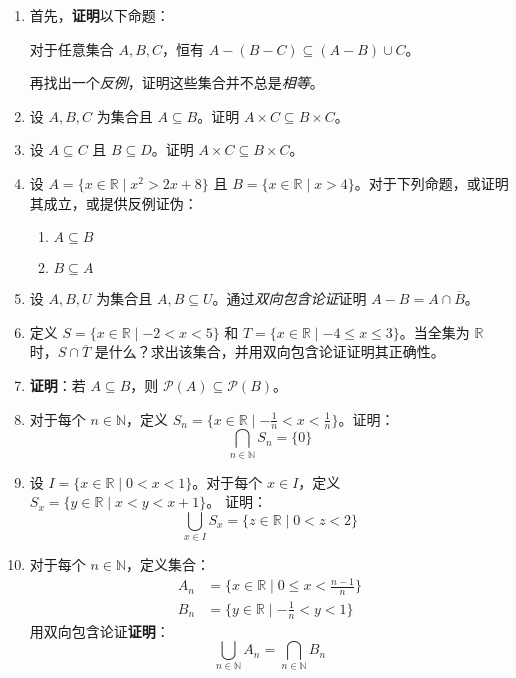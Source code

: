 \begin{enumerate}[label=(\arabic*)]
    \item 首先，\textbf{证明}以下命题：
        \begin{center}
            对于任意集合 $A,B,C$，恒有 $A - (B - C) \subseteq (A - B) \cup C$。
        \end{center}
        再找出一个\emph{反例}，证明这些集合并不总是\emph{相等}。
    \item 设 $A,B,C$ 为集合且 $A \subseteq B$。证明 $A \times C \subseteq B \times C$。
    \item 设 $A \subseteq C$ 且 $B \subseteq D$。证明 $A \times C \subseteq B \times C$。
    \item 设 $A = \{x \in \mathbb{R} \mid x^2 > 2x + 8\}$ 且 $B = \{x \in \mathbb{R} \mid x > 4\}$。对于下列命题，或证明其成立，或提供反例证伪：
        \begin{enumerate}[label=(\alph*)]
            \item $A \subseteq B$
            \item $B \subseteq A$
        \end{enumerate}
    \item 设 $A, B, U$ 为集合且 $A, B \subseteq U$。通过\emph{双向包含论证}证明 $A - B = A \cap \overline{B}$。
    \item 定义 $S = \{x \in \mathbb{R} \mid -2 < x < 5\}$ 和 $T = \{x \in \mathbb{R} \mid -4 \le x \le 3\}$。当全集为 $\mathbb{R}$ 时，$S \cap \overline{T}$ 是什么？求出该集合，并用双向包含论证证明其正确性。
    \item \textbf{证明}：若 $A \subseteq B$，则 $\mathcal{P}(A) \subseteq \mathcal{P}(B)$。\label{exc:exercises3.9.7}
    \item 对于每个 $n \in \mathbb{N}$，定义 $S_n = \{x \in \mathbb{R} \mid -\frac{1}{n} < x < \frac{1}{n}\}$。证明：
        \[\bigcap_{n \in \mathbb{N}}S_n = \{0\}\]
    \item 设 $I = \{x \in \mathbb{R} \mid 0 < x < 1\}$。对于每个 $x \in I$，定义 $S_x = \{y \in \mathbb{R} \mid x < y < x + 1\}$。 证明：
        \[\bigcup_{x \in I}S_x = \{z \in \mathbb{R} \mid 0 < z < 2\}\]
    \item 对于每个 $n \in \mathbb{N}$，定义集合：
        \begin{align*}
            A_n &= \Big\{x \in \mathbb{R} \mid 0 ≤ x < \frac{n - 1}{n}\Big\} \\
            B_n &= \Big\{y \in \mathbb{R} \mid -\frac{1}{n} < y < 1\Big\}
        \end{align*}
        用双向包含论证\textbf{证明}：
        \[\bigcup_{n \in \mathbb{N}}A_n = \bigcap_{n \in \mathbb{N}}B_n\]
\end{enumerate}
